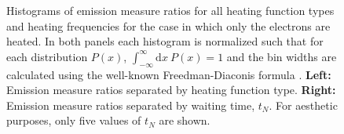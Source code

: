 \documentclass[apj]{emulateapj}
\begin{document}
\begin{figure}
{		}
		\caption{Histograms of emission measure ratios for all heating function types and heating frequencies for the case in which only the electrons are heated. In both panels each histogram is normalized such that for each distribution $P(x)$, $\int_{-\infty}^{\infty}\mathrm{d}x~P(x)=1$ and the bin widths are calculated using the well-known Freedman-Diaconis formula \citep{freedman_histogram_1981}. \textbf{Left:} Emission measure ratios separated by heating function type. \textbf{Right:} Emission measure ratios separated by waiting time, $t_N$. For aesthetic purposes, only five values of $t_N$ are shown.}
		\label{fig:em_ratio_hist_el}
	\end{figure}
	\begin{figure}
		\centering
\end{figure}
\end{document}
